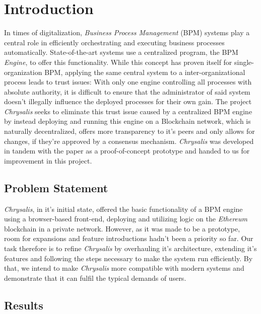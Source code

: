%
\chapter{Introduction}
\label{sec:intro}


In times of digitalization, \emph{Business Process Management} (BPM) systems play a central role in efficiently orchestrating and executing business processes automatically. State-of-the-art systems use a centralized program, the BPM \emph{Engine}, to offer this functionality. While this concept has proven itself for single-organization BPM, applying the same central system to a inter-organizational process leads to trust issues: With only one engine controlling all processes with absolute authority, it is difficult to ensure that the administrator of said system doesn't illegally influence the deployed processes for their own gain. \newline 
 The project \emph{Chrysalis} seeks to eliminate this trust issue caused by a centralized BPM engine by instead deploying and running this engine on a Blockchain network, which is naturally decentralized, offers more transparency to it's peers and only allows for changes, if they're approved by a consensus mechanism. \newline
 \emph{Chrysalis} was developed in tandem with the paper \cite{chrysalis} as a proof-of-concept prototype and handed to us for improvement in this project.


\section{Problem Statement}
\label{sec:intro:problem}

\emph{Chrysalis}, in it's initial state, offered the basic functionality of a BPM engine using a browser-based front-end, deploying and utilizing logic on the \emph{Ethereum} blockchain in a private network. However, as it was made to be a prototype, room for expansions and feature introductions hadn't been a priority so far. \newline
Our task therefore is to refine \emph{Chrysalis} by overhauling it's architecture, extending it's features and following the steps necessary to make the system run efficiently. By that, we intend to make \emph{Chrysalis} more compatible with modern systems and demonstrate that it can fulfil the typical demands of users. \newline

\section{Results}
\label{sec:intro:results}

